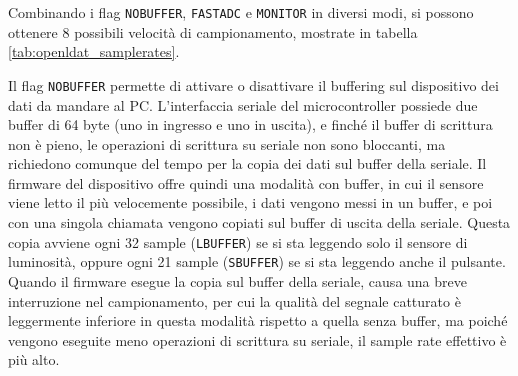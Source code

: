 Combinando i flag \texttt{NOBUFFER}, \texttt{FASTADC} e \texttt{MONITOR} in diversi modi, si possono ottenere 8 possibili velocità di campionamento, mostrate in tabella \ref{tab:openldat_samplerates}.
\begin{table}[h!]
	\centering
	\caption{\label{tab:openldat_samplerates}Velocità di campionamento}
\end{table}

Il flag \texttt{NOBUFFER} permette di attivare o disattivare il buffering sul dispositivo dei dati da mandare al PC. L'interfaccia seriale del microcontroller possiede due buffer di 64 byte (uno in ingresso e uno in uscita), e finché il buffer di scrittura non è pieno, le operazioni di scrittura su seriale non sono bloccanti, ma richiedono comunque del tempo per la copia dei dati sul buffer della seriale. Il firmware del dispositivo offre quindi una modalità con buffer, in cui il sensore viene letto il più velocemente possibile, i dati vengono messi in un buffer, e poi con una singola chiamata vengono copiati sul buffer di uscita della seriale. Questa copia avviene ogni 32 sample (\texttt{LBUFFER}) se si sta leggendo solo il sensore di luminosità, oppure ogni 21 sample (\texttt{SBUFFER}) se si sta leggendo anche il pulsante. Quando il firmware esegue la copia sul buffer della seriale, causa una breve interruzione nel campionamento, per cui la qualità del segnale catturato è leggermente inferiore in questa modalità rispetto a quella senza buffer, ma poiché vengono eseguite meno operazioni di scrittura su seriale, il sample rate effettivo è più alto.

